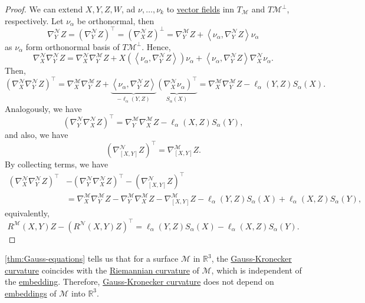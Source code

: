 \begin{proof}
	We can extend \(X, Y, Z, W\), ad \(\nu , \ldots , \nu _k\) to \hyperref[def:vector-field]{vector fields} inn \(T_{\mathcal{M} } \) and \(T \mathcal{M} ^{\perp} \), respectively. Let \(\nu _\alpha \) be orthonormal, then
	\[
		\nabla _Y^{\mathcal{N} } Z
		= (\nabla _Y^{\mathcal{N} } Z)^{\top} = (\nabla _X^{\mathcal{N} } Z)^{\perp}
		= \nabla _Y ^\mathcal{M} Z + \left\langle \nu _\alpha , \nabla _Y^{\mathcal{N} } Z \right\rangle \nu _{\alpha }
	\]
	as \(\nu _\alpha \) form orthonormal basis of \(T \mathcal{M} ^{\perp} \). Hence,
	\[
		\nabla _X ^\mathcal{N} \nabla _Y ^\mathcal{N} Z
		= \nabla _X ^{\mathcal{N} }\nabla _Y^{\mathcal{M} }Z + X(\left\langle \nu _\alpha , \nabla _Y^{\mathcal{N} } Z \right\rangle ) \nu _\alpha + \left\langle \nu _\alpha , \nabla _Y^{\mathcal{N} } Z \right\rangle \nabla _X^{\mathcal{N} } \nu _\alpha.
	\]
	Then,
	\[
		(\nabla _X^{\mathcal{N} } \nabla _Y ^{\mathcal{N} }Z)^{\top}
		= \nabla _X ^\mathcal{M} \nabla _Y ^\mathcal{M} Z + \underbrace{\left\langle \nu _\alpha , \nabla _Y ^\mathcal{N} Z \right\rangle}_{-\ell _\alpha (Y, Z)} \underbrace{(\nabla _X ^\mathcal{N} \nu _\alpha )^{\top} }_{S_\alpha (X)}
		= \nabla _X ^\mathcal{M} \nabla _Y ^\mathcal{M} Z - \ell _\alpha (Y, Z) S_\alpha (X).
	\]
	Analogously, we have
	\[
		(\nabla ^\mathcal{N} _Y \nabla ^\mathcal{N} _X Z)^{\top}
		= \nabla _Y ^\mathcal{M} \nabla _X ^\mathcal{M} Z - \ell _\alpha (X, Z) S_\alpha (Y),
	\]
	and also, we have
	\[
		(\nabla ^\mathcal{N} _{[X, Y]} Z)^{\top} = \nabla ^\mathcal{M} _{[X, Y]} Z.
	\]
	By collecting terms, we have
	\[
		\begin{split}
			(\nabla ^\mathcal{N} _X \nabla ^\mathcal{N} _Y Z) ^{\top} &- (\nabla ^\mathcal{N} _Y \nabla ^\mathcal{N} _X Z) ^{\top} - (\nabla ^\mathcal{N} _{[X, Y]} Z) ^{\top}\\
			&= \nabla _X ^\mathcal{M} \nabla _Y ^\mathcal{M} Z - \nabla _Y ^{\mathcal{M} } \nabla _X ^\mathcal{M} Z - \nabla ^\mathcal{M} _{[X, Y]} Z - \ell _\alpha (Y, Z) S_\alpha (X) + \ell _\alpha (X, Z) S_\alpha (Y),
		\end{split}
	\]
	equivalently,
	\[
		R^{\mathcal{M}} (X, Y)Z - (R^{\mathcal{N} } (X, Y)Z)^{\top} = \ell _\alpha (Y, Z)S_\alpha (X) - \ell _\alpha (X, Z)S_{\alpha }(Y).
	\]
\end{proof}

\autoref{thm:Gauss-equations} tells us that for a surface \(\mathcal{M} \) in \(\mathbb{R} ^3\), the \hyperref[def:Gauss-Kronecker-curvature]{Gauss-Kronecker curvature} coincides with the \hyperref[def:Riemannian-curvature]{Riemannian curvature} of \(\mathcal{M} \), which is independent of the \hyperref[def:embedding]{embedding}. Therefore, \hyperref[def:Gauss-Kronecker-curvature]{Gauss-Kronecker curvature} does not depend on \hyperref[def:embedding]{embeddings} of \(\mathcal{M} \) into \(\mathbb{R} ^3\).

